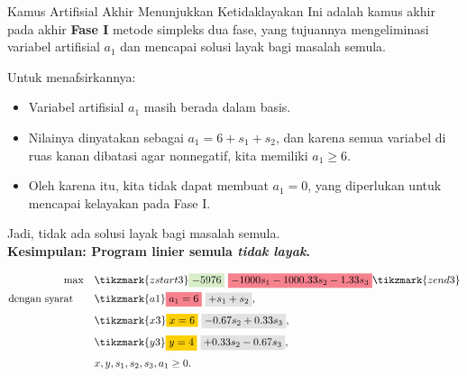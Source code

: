 \begin{remark}{Kamus Artifisial Akhir Menunjukkan Ketidaklayakan}{}
Ini adalah kamus akhir pada akhir \textbf{Fase I} metode simpleks dua fase, yang tujuannya mengeliminasi variabel artifisial \(a_1\) dan mencapai solusi layak bagi masalah semula.

Untuk menafsirkannya:
\begin{itemize}
    \item Variabel artifisial \(a_1\) masih berada dalam basis.
    \item Nilainya dinyatakan sebagai \(a_1 = 6 + s_1 + s_2\), dan karena semua variabel di ruas kanan dibatasi agar nonnegatif, kita memiliki \(a_1 \ge 6\).
    \item Oleh karena itu, kita tidak dapat membuat \(a_1 = 0\), yang diperlukan untuk mencapai kelayakan pada Fase I.
\end{itemize}

Jadi, tidak ada solusi layak bagi masalah semula.  \\
\textbf{Kesimpulan: Program linier semula \emph{tidak layak}.}

\vspace{1cm}

\[
\begin{aligned}
\max \quad 
& \tikzmark{zstart3} \text{\colorbox{green!20!white}{$-5976$}} ~ \text{\colorbox{red!50!white}{$- 1000s_1 - 1000.33s_2 - 1.33s_3$}} \tikzmark{zend3} \\
\st \quad 
& \tikzmark{a1} \text{\colorbox{red!50!white}{$a_1 = 6$}} ~ \text{\colorbox{gray!20!white}{$+ s_1 + s_2$}},\\[1mm]
& \tikzmark{x3} \text{\colorbox{yellow}{$x = 6$}} ~ \text{\colorbox{gray!20!white}{$- 0.67s_2 + 0.33s_3$}},\\[1mm]
& \tikzmark{y3} \text{\colorbox{yellow}{$y = 4$}} ~ \text{\colorbox{gray!20!white}{$+ 0.33s_2 - 0.67s_3$}},\\[1mm]
& x, y, s_1, s_2, s_3, a_1 \geq 0.
\end{aligned}
\]

\end{remark}

